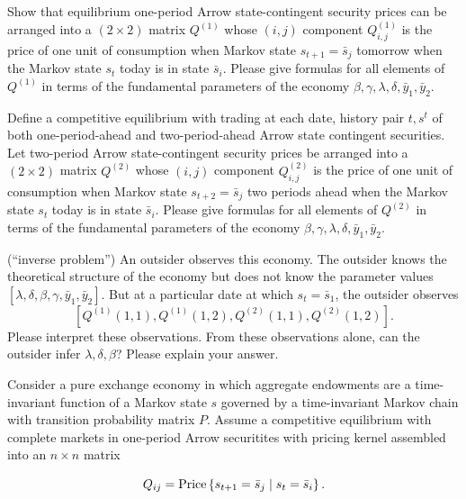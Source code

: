 \medskip

  Show that equilibrium  one-period Arrow state-contingent security prices can be arranged into a $(2 \times 2)$ matrix $Q^{(1)}$ whose  $(i,j)$ component $Q^{(1)}_{i,j}$
is the price of one unit of consumption when Markov state $s_{t+1} = \bar s_j$   tomorrow  when the Markov state $s_t$ today is in state $\bar s_i$.
Please give formulas for all elements of $Q^{(1)}$ in terms of the fundamental parameters of the economy $\beta, \gamma, \lambda, \delta, \bar y_1, \bar y_2$.

\medskip

  Define a competitive equilibrium with trading at each date, history pair $t, s^t$ of both one-period-ahead and two-period-ahead Arrow state contingent securities.
Let  two-period Arrow state-contingent security prices be arranged into a $(2 \times 2)$ matrix $Q^{(2)}$ whose  $(i,j)$ component
$Q^{(2)}_{i,j}$ is the price of one unit of consumption when Markov state $s_{t+2} = \bar s_j$   two periods ahead  when the Markov state $s_t$ today is in state $\bar s_i$.
Please give formulas for all elements of $Q^{(2)}$ in terms of the fundamental parameters of the economy $\beta, \gamma, \lambda, \delta, \bar y_1, \bar y_2$.

\medskip

 (``inverse problem'')  An outsider observes this economy. The outsider knows the theoretical structure of the economy but does not know the parameter values $[\lambda, \delta, \beta,
\gamma, \bar y_1, \bar y_2]$. But at a particular date at which $s_t = \bar s_1$, the outsider observes
$$[Q^{(1)}(1,1), Q^{(1)}(1,2), Q^{(2)}(1,1), Q^{(2)}(1,2)] .$$
Please interpret these observations.
From these observations
alone, can the outsider infer $\lambda, \delta,  \beta$?   Please explain your answer.

\medskip

%
 
\medskip

\noindent Consider a pure exchange  economy in which aggregate endowments are a time-invariant function of a Markov state $s$
governed by a time-invariant Markov chain with transition probability matrix $P$.  Assume a competitive equilibrium  with 
complete markets in one-period Arrow securitites with pricing kernel assembled into an   $n \times n$ matrix


$$
Q_{ij} = {\rm{Price}} \left\{s_{t+1} = \bar{s}_j \mid s_t = \bar{s}_i \right\}.
$$


